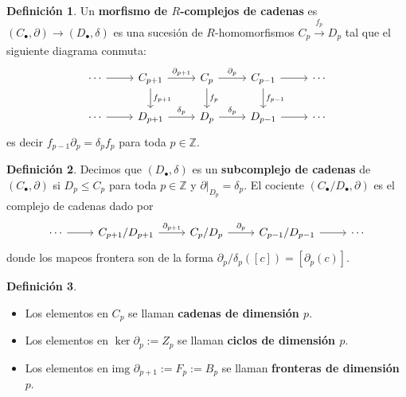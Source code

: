 \documentclass[spanish]{book}
\theoremstyle{definition}
\newtheorem*{defn}{Definición}
\begin{document}
	\begin{defn}
		Un \textbf{morfismo de $R$-complejos de cadenas} es $(C_\bullet{},\partial)\to(D_\bullet{},\delta)$ es una sucesión de $R$-homomorfismos $C_p\xrightarrow[]{f_p} D_p$ tal que el siguiente diagrama conmuta:
		\[
		\begin{tikzcd}
			\cdots \arrow{r} & C_{p+1} \arrow{r}{\partial_{p+1}} \arrow{d}{f_{p+1}} & C_p \arrow{r}{\partial_p} \arrow{d}{f_p} & C_{p-1} \arrow{r} \arrow{d}{f_{p-1}} & \cdots \\
			\cdots \arrow{r} & D_{p+1} \arrow{r}{\delta_p} & D_p \arrow{r}{\delta_p} & D_{p-1} \arrow{r} & \cdots
		\end{tikzcd}
		\]
		es decir $f_{p-1}\partial_p=\delta_pf_p$ para toda $p\in\mathbb{Z}$.
	\end{defn}
	\begin{defn}
		Decimos que $(D_\bullet,\delta)$ es un \textbf{subcomplejo de cadenas} de $(C_\bullet,\partial)$ si $D_p\leq C_p$ para toda $p\in\mathbb Z$ y $\partial|_{D_p}=\delta_p$. El cociente $(C_\bullet/D_\bullet,\partial)$ es el complejo de cadenas dado por
		\[
		\begin{tikzcd}
			\cdots \arrow{r} & C_{p+1}/D_{p+1} \arrow{r}{\partial_{p+1}} & C_{p}/D_{p} \arrow{r}{\partial_{p}} & C_{p-1}/D_{p-1} \arrow{r} & \cdots
		\end{tikzcd}
		\]
		donde los mapeos frontera son de la forma $\partial_p/\delta_p([c])=[\partial_p(c)]$.
	\end{defn}
	\begin{defn}\leavevmode
		\begin{itemize}
			\item Los elementos en $C_p$ se llaman \textbf{cadenas de dimensión $p$}.
			\item Los elementos en $\ker\partial_p:=Z_p$ se llaman \textbf{ciclos de dimensión $p$}.
			\item Los elementos en $\text{img }\partial_{p+1}:=F_p:=B_p$ se llaman \textbf{fronteras de dimensión $p$}.
		\end{itemize}
	\end{defn}
	
\end{document}
